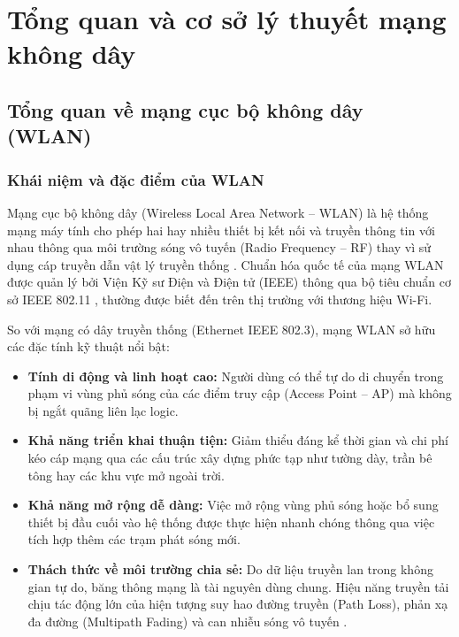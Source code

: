 \chapter{Tổng quan và cơ sở lý thuyết mạng không dây}
\label{chap:ly-thuyet}

\section{Tổng quan về mạng cục bộ không dây (WLAN)}

\subsection{Khái niệm và đặc điểm của WLAN}

Mạng cục bộ không dây (Wireless Local Area Network -- WLAN) là hệ thống mạng máy tính cho phép hai hay nhiều thiết bị kết nối và truyền thông tin với nhau thông qua môi trường sóng vô tuyến (Radio Frequency -- RF) thay vì sử dụng cáp truyền dẫn vật lý truyền thống \cite{kurose2021computer}. Chuẩn hóa quốc tế của mạng WLAN được quản lý bởi Viện Kỹ sư Điện và Điện tử (IEEE) thông qua bộ tiêu chuẩn cơ sở IEEE 802.11 \cite{ieee80211_2020}, thường được biết đến trên thị trường với thương hiệu Wi-Fi.

So với mạng có dây truyền thống (Ethernet IEEE 802.3), mạng WLAN sở hữu các đặc tính kỹ thuật nổi bật:
\begin{itemize}
    \item \textbf{Tính di động và linh hoạt cao:} Người dùng có thể tự do di chuyển trong phạm vi vùng phủ sóng của các điểm truy cập (Access Point -- AP) mà không bị ngắt quãng liên lạc logic.
    \item \textbf{Khả năng triển khai thuận tiện:} Giảm thiểu đáng kể thời gian và chi phí kéo cáp mạng qua các cấu trúc xây dựng phức tạp như tường dày, trần bê tông hay các khu vực mở ngoài trời.
    \item \textbf{Khả năng mở rộng dễ dàng:} Việc mở rộng vùng phủ sóng hoặc bổ sung thiết bị đầu cuối vào hệ thống được thực hiện nhanh chóng thông qua việc tích hợp thêm các trạm phát sóng mới.
    \item \textbf{Thách thức về môi trường chia sẻ:} Do dữ liệu truyền lan trong không gian tự do, băng thông mạng là tài nguyên dùng chung. Hiệu năng truyền tải chịu tác động lớn của hiện tượng suy hao đường truyền (Path Loss), phản xạ đa đường (Multipath Fading) và can nhiễu sóng vô tuyến \cite{pahlavan2020principles}.
\end{itemize}

